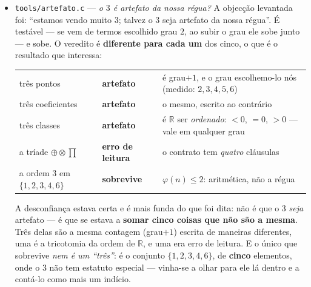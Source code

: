 \documentclass[11pt]{article}
\newcommand{\code}[1]{\texttt{\small #1}}
\newcommand{\R}{\mathbb R}
\theoremstyle{plain}
\theoremstyle{remark}
\begin{document}
\begin{itemize}
E a régua \emph{é} a parábola: $q(a,b) = 1\cdot a^2 + Bab + Cb^2$, \textbf{mónica} --- o primeiro
coeficiente é $1$, logo são \emph{três} números e não quatro. No grau $1$ não há invariante
nenhum; no grau $2$ o $\Delta$ sobrevive ao transporte. \emph{O plano é estéril não por lhe faltar
energia, mas por lhe faltar invariante} --- e a régua parabólica, $\Delta=0$, é a forma $a^2$, um
quadrado perfeito: plana, sem cone e sem giro, a fronteira onde o corpo degenera. O axioma e a
assinatura desta régua dizem a mesma coisa.

Fica anotado, e \emph{não} afirmado, que os cinco ``três'' rimam --- três pontos, três
coeficientes, três classes, três operações $\oplus\otimes\prod$, e a ordem $3$ do axioma. Os três
primeiros são a \emph{mesma} contagem, e isso está medido; que os outros dois sejam o mesmo
teorema não medi, e dizê-lo seria enfeite.
\item \code{tools/artefato.c} --- \emph{o $3$ é artefato da nossa régua?} A objecção levantada foi:
``estamos vendo muito $3$; talvez o $3$ seja artefato da nossa régua''. É testável --- se vem de
termos escolhido grau $2$, ao subir o grau ele sobe junto --- e sobe. O veredito é \textbf{diferente
para cada um} dos cinco, o que é o resultado que interessa:

\begin{center}\begin{tabular}{lll}
três pontos & \textbf{artefato} & é grau$+1$, e o grau escolhemo-lo nós (medido: $2,3,4,5,6$) \\
três coeficientes & \textbf{artefato} & o mesmo, escrito ao contrário \\
três classes & \textbf{artefato} & é $\R$ ser \emph{ordenado}: $<0$, $=0$, $>0$ --- vale em qualquer grau \\
a tríade $\oplus\otimes\prod$ & \textbf{erro de leitura} & o contrato tem \emph{quatro} cláusulas \\
a ordem $3$ em $\{1,2,3,4,6\}$ & \textbf{sobrevive} & $\varphi(n) \le 2$: aritmética, não a régua \\
\end{tabular}\end{center}

A desconfiança estava certa e é mais funda do que foi dita: não é que o $3$ \emph{seja} artefato ---
é que se estava a \textbf{somar cinco coisas que não são a mesma}. Três delas são a mesma contagem
(grau$+1$) escrita de maneiras diferentes, uma é a tricotomia da ordem de $\R$, e uma era erro de leitura.
E o único que sobrevive \emph{nem é um ``três''}: é o conjunto $\{1,2,3,4,6\}$, de \textbf{cinco}
elementos, onde o $3$ não tem estatuto especial --- vinha-se a olhar para ele lá dentro e a
contá-lo como mais um indício.


\end{itemize}
\end{document}
